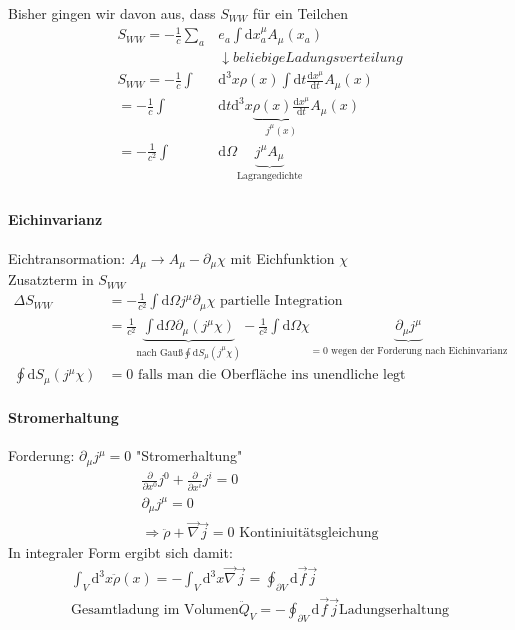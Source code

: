 \documentclass[a4paper]{article}
\begin{document}
Bisher gingen wir davon aus, dass $S_{WW}$ für ein Teilchen
\begin{align}
S_{WW}=-\frac{1}{c}\sum_a&e_a\int \mathrm{d}x_a^\mu A_\mu(x_a)\\
&\downarrow beliebige Ladungsverteilung\\
S_{WW}=-\frac{1}{c}\int&\mathrm{d}^3x\rho(x)\int \mathrm{d}t\frac{\mathrm{d}x^\mu}{\mathrm{d}t}A_\mu(x)\\
=-\frac{1}{c}\int&\mathrm{d}t\mathrm{d}^3x\underbrace{\rho(x)\frac{\mathrm{d}x^\mu}{\mathrm{d}t}}_{j^\mu(x)}A_\mu(x)\\
=-\frac{1}{c^2}\int&\mathrm{d}\Omega \underbrace{j^\mu A_\mu}_{\text{Lagrangedichte}}\\
\end{align}
\paragraph{Eichinvarianz}
Eichtransormation: $A_\mu\rightarrow A_\mu-\partial_\mu\chi$ mit Eichfunktion
$\chi$\\
Zusatzterm in $S_{WW}$\\
\begin{align}
\Delta S_{WW}&=-\frac{1}{c^2}\int \mathrm{d}\Omega j^\mu \partial_\mu\chi
\text{   partielle Integration}\\
&=\frac{1}{c^2}\underbrace{\int \mathrm{d}\Omega \partial_\mu(j^\mu\chi)}_{\text{nach
Gauß} \oint \mathrm{d}S_\mu(j^\mu\chi)}-\frac{1}{c^2}\int \mathrm{d}\Omega
\chi\underbrace{\partial_\mu j^\mu}_{=0 \text{ wegen der Forderung nach
Eichinvarianz}}\\
\oint \mathrm{d}S_\mu(j^\mu\chi)&=0 \text{ falls man die Oberfläche ins unendliche legt}
\end{align}
\paragraph{Stromerhaltung}
Forderung: $\partial_\mu j^\mu=0$ "Stromerhaltung"
\begin{align}
\frac{\partial}{\partial x^0}j^0+\frac{\partial}{\partial x^i}j^i=0 \\
\partial_\mu j^\mu=0\\
\Rightarrow \ddot{\rho}+\vec{\nabla}\vec{j}=0 \text{  Kontiniuitätsgleichung}
\end{align}
In integraler Form ergibt sich damit:
\begin{align}
\int_V \mathrm{d}^3x\ddot{\rho}(x)=-\int_V \mathrm{d}^3x \vec{\nabla}\vec{j} = \oint_{\partial
V}\mathrm{d}\vec{f}\vec{j}\\
\text{Gesamtladung im Volumen} \ddot{Q}_V=-\oint_{\partial V}\mathrm{d}\vec{f}\vec{j}
\text{Ladungserhaltung}
\end{align}
\end{document}
